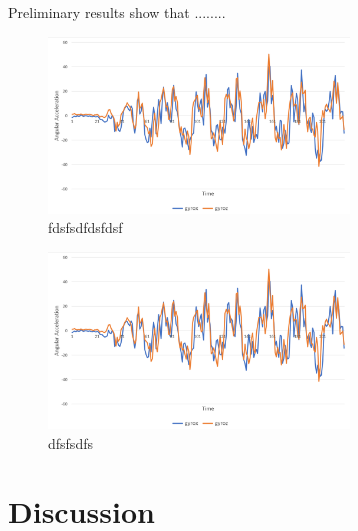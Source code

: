 \documentclass[conference]{IEEEtran}
\begin{document}
Preliminary results show that ........

\begin{figure}[h!]
\centering
\includegraphics[width=8cm]{gait.png}
\caption{fdsfsdfdsfdsf }
\label{fig:smart-vest}
\end{figure}


\begin{figure}[h!]
\centering
\includegraphics[width=8cm]{gait.png}
\caption{dfsfsdfs }
\label{fig:smart-vest}
\end{figure}

%
%
%

\section*{Discussion}
\end{document}

